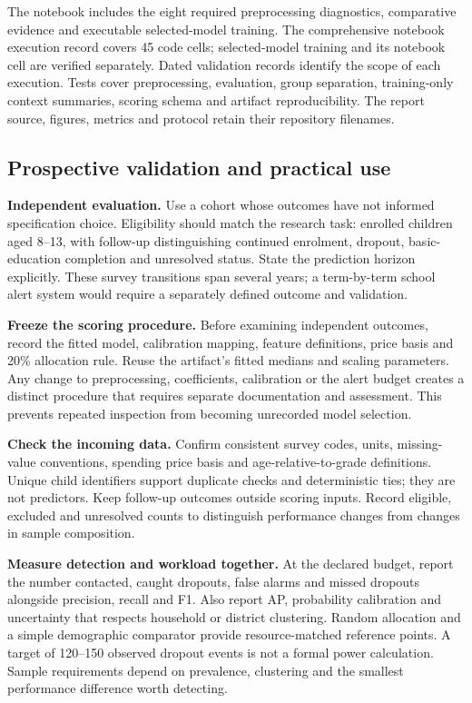 \documentclass[conference,a4paper]{IEEEtran}
\begin{document}
The notebook includes the eight required preprocessing diagnostics, comparative evidence and executable selected-model training. The comprehensive notebook execution record covers 45 code cells; selected-model training and its notebook cell are verified separately. Dated validation records identify the scope of each execution. Tests cover preprocessing, evaluation, group separation, training-only context summaries, scoring schema and artifact reproducibility. The report source, figures, metrics and protocol retain their repository filenames.

\newpage
\subsection{\textbf{Prospective validation and practical use}}
\textbf{Independent evaluation.} Use a cohort whose outcomes have not informed specification choice. Eligibility should match the research task: enrolled children aged 8--13, with follow-up distinguishing continued enrolment, dropout, basic-education completion and unresolved status. State the prediction horizon explicitly. These survey transitions span several years; a term-by-term school alert system would require a separately defined outcome and validation.

\textbf{Freeze the scoring procedure.} Before examining independent outcomes, record the fitted model, calibration mapping, feature definitions, price basis and 20\% allocation rule. Reuse the artifact's fitted medians and scaling parameters. Any change to preprocessing, coefficients, calibration or the alert budget creates a distinct procedure that requires separate documentation and assessment. This prevents repeated inspection from becoming unrecorded model selection.

\textbf{Check the incoming data.} Confirm consistent survey codes, units, missing-value conventions, spending price basis and age-relative-to-grade definitions. Unique child identifiers support duplicate checks and deterministic ties; they are not predictors. Keep follow-up outcomes outside scoring inputs. Record eligible, excluded and unresolved counts to distinguish performance changes from changes in sample composition.

\textbf{Measure detection and workload together.} At the declared budget, report the number contacted, caught dropouts, false alarms and missed dropouts alongside precision, recall and F1. Also report AP, probability calibration and uncertainty that respects household or district clustering. Random allocation and a simple demographic comparator provide resource-matched reference points. A target of 120--150 observed dropout events is not a formal power calculation. Sample requirements depend on prevalence, clustering and the smallest performance difference worth detecting.
\end{document}

